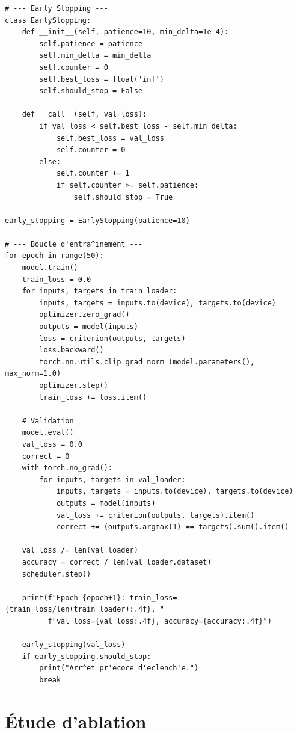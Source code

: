 \begin{codeblock}[title=\textbf{Boucle d'entra\^inement r\'egularis\'ee compl\`ete}]
\begin{verbatim}
# --- Early Stopping ---
class EarlyStopping:
    def __init__(self, patience=10, min_delta=1e-4):
        self.patience = patience
        self.min_delta = min_delta
        self.counter = 0
        self.best_loss = float('inf')
        self.should_stop = False

    def __call__(self, val_loss):
        if val_loss < self.best_loss - self.min_delta:
            self.best_loss = val_loss
            self.counter = 0
        else:
            self.counter += 1
            if self.counter >= self.patience:
                self.should_stop = True

early_stopping = EarlyStopping(patience=10)

# --- Boucle d'entra^inement ---
for epoch in range(50):
    model.train()
    train_loss = 0.0
    for inputs, targets in train_loader:
        inputs, targets = inputs.to(device), targets.to(device)
        optimizer.zero_grad()
        outputs = model(inputs)
        loss = criterion(outputs, targets)
        loss.backward()
        torch.nn.utils.clip_grad_norm_(model.parameters(), max_norm=1.0)
        optimizer.step()
        train_loss += loss.item()

    # Validation
    model.eval()
    val_loss = 0.0
    correct = 0
    with torch.no_grad():
        for inputs, targets in val_loader:
            inputs, targets = inputs.to(device), targets.to(device)
            outputs = model(inputs)
            val_loss += criterion(outputs, targets).item()
            correct += (outputs.argmax(1) == targets).sum().item()

    val_loss /= len(val_loader)
    accuracy = correct / len(val_loader.dataset)
    scheduler.step()

    print(f"Epoch {epoch+1}: train_loss={train_loss/len(train_loader):.4f}, "
          f"val_loss={val_loss:.4f}, accuracy={accuracy:.4f}")

    early_stopping(val_loss)
    if early_stopping.should_stop:
        print("Arr^et pr'ecoce d'eclench'e.")
        break
\end{verbatim}
\end{codeblock}

\section{\'Etude d'ablation}
\label{sec:reg-ablation}

